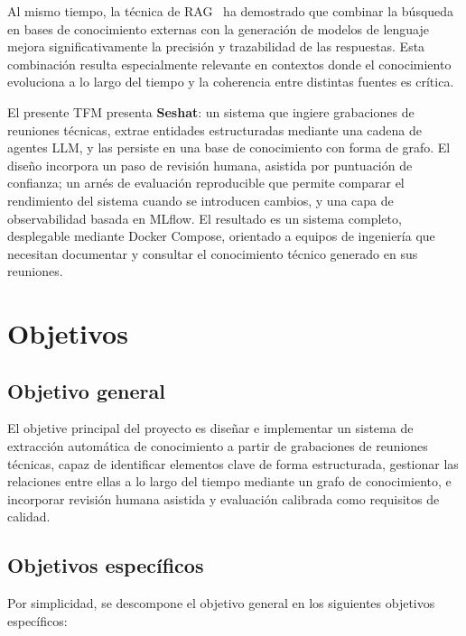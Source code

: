 Al mismo tiempo, la técnica de \ac{RAG}~\cite{lewis2020rag} ha demostrado que combinar la
búsqueda en bases de conocimiento externas con la generación de modelos de lenguaje mejora
significativamente la precisión y trazabilidad de las respuestas. Esta combinación resulta
especialmente relevante en contextos donde el conocimiento evoluciona a lo largo del tiempo y
la coherencia entre distintas fuentes es crítica.

El presente \ac{TFM} presenta \textbf{Seshat}: un sistema que ingiere grabaciones de reuniones
técnicas, extrae entidades estructuradas mediante una cadena de agentes LLM, y las persiste en
una base de conocimiento con forma de grafo. El diseño incorpora un paso de revisión humana,
asistida por puntuación de confianza; un arnés de evaluación reproducible que permite comparar
el rendimiento del sistema cuando se introducen cambios, y una capa de observabilidad basada en
MLflow. El resultado es un sistema completo, desplegable mediante Docker Compose, orientado a
equipos de ingeniería que necesitan documentar y consultar el conocimiento técnico generado en
sus reuniones.

\section{Objetivos}

\subsection{Objetivo general}

El objetive principal del proyecto es diseñar e implementar un sistema de extracción automática
de conocimiento a partir de grabaciones de reuniones técnicas, capaz de identificar elementos
clave de forma estructurada, gestionar las relaciones entre ellas a lo largo del tiempo mediante
un grafo de conocimiento, e incorporar revisión humana asistida y evaluación calibrada como
requisitos de calidad.

\subsection{Objetivos específicos}

Por simplicidad, se descompone el objetivo general en los siguientes objetivos específicos:

